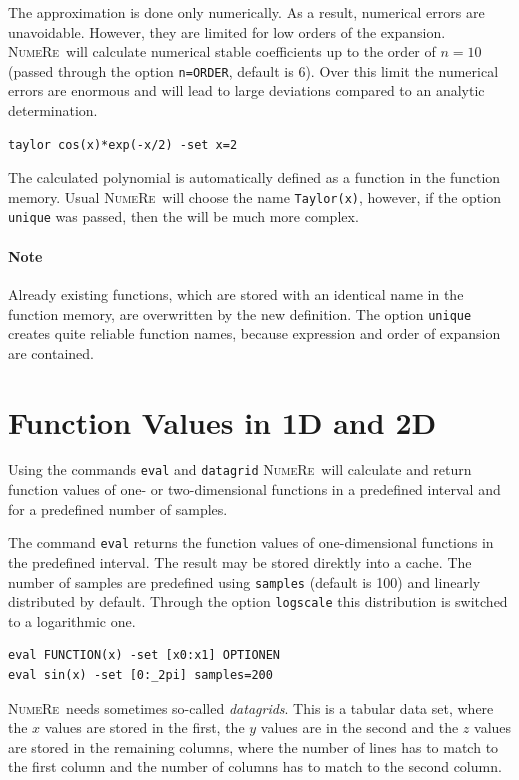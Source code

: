 \documentclass[DIV=14,headsepline,footsepline]{scrbook}
\newcommand{\NR}{\textsc{Nu\-me\-Re}}
\begin{document}
				The approximation is done only numerically. As a result, numerical errors are unavoidable. However, they are limited for low orders of the expansion. \NR\ will calculate numerical stable coefficients up to the order of $n = 10$ (passed through the option \verb+n=ORDER+, default is 6). Over this limit the numerical errors are enormous and will lead to large deviations compared to an analytic determination.
				\begin{lstlisting}
taylor cos(x)*exp(-x/2) -set x=2
				\end{lstlisting}
				
				The calculated polynomial is automatically defined as a function in the function memory. Usual \NR\ will choose the name \verb+Taylor(x)+, however, if the option \verb+unique+ was passed, then the will be much more complex.
				\paragraph{Note} Already existing functions, which are stored with an identical name in the function memory, are overwritten by the new definition. The option \verb+unique+ creates quite reliable function names, because expression and order of expansion are contained.
				
			\section{Function Values in 1D and 2D} %
				Using the commands \verb+eval+ and \verb+datagrid+ \NR\ will calculate and return function values of one- or two-dimensional functions in a predefined interval and for a predefined number of samples.
				
				The command \verb+eval+ returns the function values of one-dimensional functions in the predefined interval. The result may be stored direktly into a cache. The number of samples are predefined using \verb+samples+ (default is 100) and linearly distributed by default. Through the option \verb+logscale+ this distribution is switched to a logarithmic one.
				\begin{lstlisting}
eval FUNCTION(x) -set [x0:x1] OPTIONEN
eval sin(x) -set [0:_2pi] samples=200
				\end{lstlisting}
				
				\NR\ needs sometimes so-called \emph{datagrids}. This is a tabular data set, where the $x$ values are stored in the first, the $y$ values are in the second and the $z$ values are stored in the remaining columns, where the number of lines has to match to the first column and the number of columns has to match to the second column.
				
\end{document}
